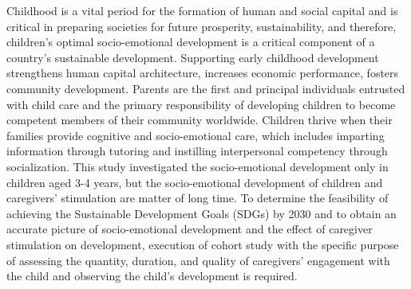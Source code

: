 \documentclass[
  12pt,
  oneside]{report}
\begin{document}
Childhood is a vital period for the formation of human and social capital and is critical in preparing societies for future prosperity, sustainability, and therefore, children's optimal socio-emotional development is a critical component of a country's sustainable development. Supporting early childhood development strengthens human capital architecture, increases economic performance, fosters community development. Parents are the first and principal individuals entrusted with child care and the primary responsibility of developing children to become competent members of their community worldwide. Children thrive when their families provide cognitive and socio-emotional care, which includes imparting information through tutoring and instilling interpersonal competency through socialization. This study investigated the socio-emotional development only in children aged 3-4 years, but the socio-emotional development of children and caregivers' stimulation are matter of long time. To determine the feasibility of achieving the Sustainable Development Goals (SDGs) by 2030 and to obtain an accurate picture of socio-emotional development and the effect of caregiver stimulation on development, execution of cohort study with the specific purpose of assessing the quantity, duration, and quality of caregivers' engagement with the child and observing the child's development is required.

\newpage

\renewcommand\bibname{Bibliography}
  
\end{document}
